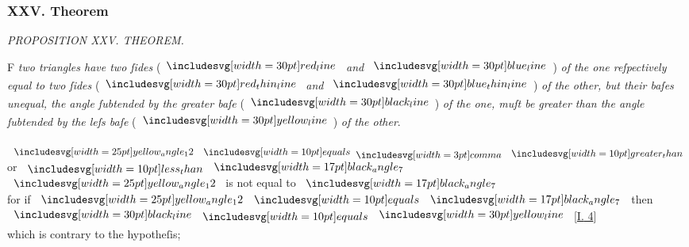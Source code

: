 \documentclass[11pt,preview]{standalone}
\begin{document}
\subsubsection{XXV. Theorem}

\begin{minipage}[t]{0.55\textwidth}
    \begin{center}
        \textit{PROPOSITION XXV. THEOREM.}\label{book1pr25} \\
    \end{center}

    \hfill

    \begin{center}
        \raggedright \lettrine[lines=3, loversize=1, nindent=0pt]{}{}F \textit{two triangles have two ſides} (\hspace{-1ex}$\redline$ \textit{and} $\blueline$\hspace{-1ex}) \textit{of the one reſpectively equal to two ſides} (\hspace{-1ex}$\redthinline$ \textit{and} $\bluethinline$\hspace{-1ex}) \textit{of the other, but their baſes unequal, the angle ſubtended by the greater baſe} (\hspace{-1ex}$\blackline$\hspace{-1ex}) \textit{of the one, muſt be greater than the angle ſubtended by the leſs baſe} (\hspace{-1ex}$\yellowline$\hspace{-1ex}) \textit{of the other}.
    \end{center}
\end{minipage}%
\hfill
\begin{minipage}[t]{0.43\textwidth}
    \vspace{20pt}
    
\end{minipage}


{\vspace{1ex}\begin{center}
    $\img{yellow_angle_12} \bequals \bcomma \bgt$ or $\blt \img[0][0][17]{black_angle_7}$\\
    $\img{yellow_angle_12}$ is not equal to $\img[0][0][17]{black_angle_7}$\\
    for if $\img{yellow_angle_12} \bequals \img[0][0][17]{black_angle_7}$ then $\blackline \bequals \yellowline$ [\hyperref[book1pr4]{\textsc{I.} 4}]\\
    which is contrary to the hypotheſis;
\end{center}}
\end{document}
